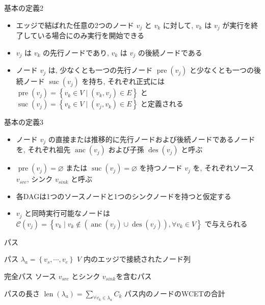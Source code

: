 \begin{frame}{基本の定義2}
    \begin{itemize}
        \item エッジで結ばれた任意の2つのノード $v_{j}$ と $v_{k}$ に対して, $v_{k}$ は $v_{j}$ が実行を終了している場合にのみ実行を開始できる
        \item $v_{j}$ は $v_{k}$ の先行ノードであり, $v_{k}$ は $v_{j}$ の後続ノードである
        \item ノード $v_{j}$ は, 少なくとも一つの先行ノード $\operatorname{pre}\left(v_{j}\right)$ と少なくとも一つの後続ノード $\operatorname{suc}\left(v_{j}\right)$ を持ち, それぞれ正式には $\operatorname{pre}\left(v_{j}\right)=\left\{v_{k} \in V \mid\left(v_{k}, v_{j}\right) \in E\right\}$ と $\operatorname{suc}\left(v_{j}\right)=\left\{v_{k} \in V \mid\left(v_{j}, v_{k}\right) \in E\right\}$ と定義される
    \end{itemize}
\end{frame}

\begin{frame}{基本の定義3}
    \begin{itemize}
        \item ノード $v_{j}$ の直接または推移的に先行ノードおよび後続ノードであるノードを, それぞれ祖先 $\operatorname{anc}\left(v_{j}\right)$ および子孫 $\operatorname{des}\left(v_{j}\right)$ と呼ぶ
        \item $\operatorname{pre}\left(v_{j}\right)=\varnothing$ または $\operatorname{suc}\left(v_{j}\right)=\varnothing$ を持つノード $v_{j}$ を, それぞれソース $v_{s r c}$, シンク $ v_{s i n k}$ と呼ぶ
        \item 各DAGは1つのソースノードと1つのシンクノードを持つと仮定する
        \item $v_{j}$ と同時実行可能なノードは $\mathcal{C}\left(v_{j}\right)=\left\{v_{k} \mid v_{k} \notin\left(\operatorname{anc}\left(v_{j}\right) \cup \operatorname{des}\left(v_{j}\right)\right), \forall v_{k} \in V\right\}$ で与えられる
    \end{itemize}
\end{frame}

\begin{frame}{パス}
    \begin{block}{パス $\lambda_{a}=\left\{v_{s}, \cdots, v_{e}\right\}$}
        $V$ 内のエッジで接続されたノード列
    \end{block}
    \begin{block}{完全パス}
        ソース $v_{s r c}$ とシンク $v_{s i n k}$を含むパス
    \end{block}
    \begin{block}{パスの長さ $\operatorname{len}\left(\lambda_{a}\right)=\sum_{\forall v_{k} \in \lambda_{a}} C_{k}$}
        パス内のノードのWCETの合計
    \end{block}
\end{frame}

